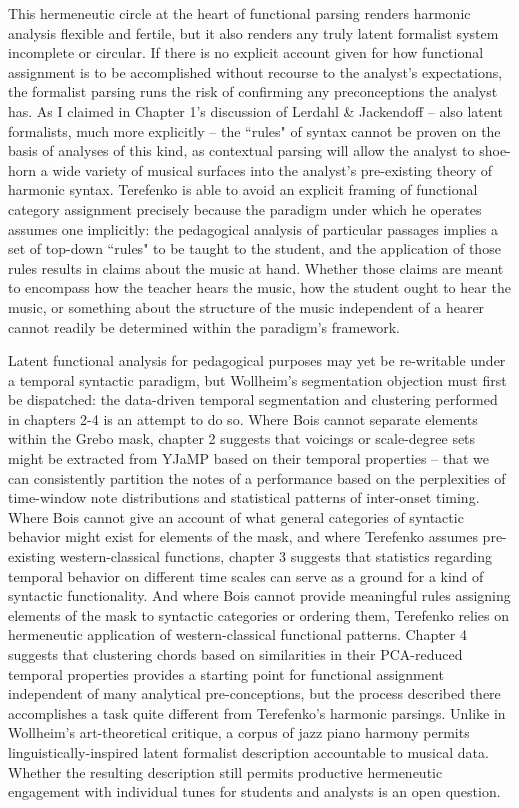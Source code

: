 This hermeneutic circle at the heart of functional parsing renders harmonic analysis flexible and fertile, but it also renders any truly latent formalist system incomplete or circular.  If there is no explicit account given for how functional assignment is to be accomplished without recourse to the analyst's expectations, the formalist parsing runs the risk of confirming any preconceptions the analyst has.  As I claimed in Chapter 1's discussion of Lerdahl \& Jackendoff -- also latent formalists, much more explicitly -- the ``rules" of syntax cannot be proven on the basis of analyses of this kind, as contextual parsing will allow the analyst to shoe-horn a wide variety of musical surfaces into the analyst's pre-existing theory of harmonic syntax.  Terefenko is able to avoid an explicit framing of functional category assignment precisely because the paradigm under which he operates assumes one implicitly: the pedagogical analysis of particular passages implies a set of top-down ``rules" to be taught to the student, and the application of those rules results in claims about the music at hand.  Whether those claims are meant to encompass how the teacher hears the music, how the student ought to hear the music, or something about the structure of the music independent of a hearer cannot readily be determined within the paradigm's framework.%

Latent functional analysis for pedagogical purposes may yet be re-writable under a temporal syntactic paradigm, but Wollheim's segmentation objection must first be dispatched: the data-driven temporal segmentation and clustering performed in chapters 2-4 is an attempt to do so.  Where Bois cannot separate elements within the Grebo mask, chapter 2 suggests that voicings or scale-degree sets might be extracted from YJaMP based on their temporal properties -- that we can consistently partition the notes of a performance based on the perplexities of time-window note distributions and statistical patterns of inter-onset timing.  Where Bois cannot give an account of what general categories of syntactic behavior might exist for elements of the mask, and where Terefenko assumes pre-existing western-classical functions, chapter 3 suggests that statistics regarding temporal behavior on different time scales can serve as a ground for a kind of syntactic functionality.  And where Bois cannot provide meaningful rules assigning elements of the mask to syntactic categories or ordering them, Terefenko relies on hermeneutic application of western-classical functional patterns.  Chapter 4 suggests that clustering chords based on similarities in their PCA-reduced temporal properties provides a starting point for functional assignment independent of many analytical pre-conceptions, but the process described there accomplishes a task quite different from  Terefenko's harmonic parsings.  Unlike in Wollheim's art-theoretical critique, a corpus of jazz piano harmony permits linguistically-inspired latent formalist description accountable to musical data.  Whether the resulting description still permits productive hermeneutic engagement with individual tunes for students and analysts is an open question.

